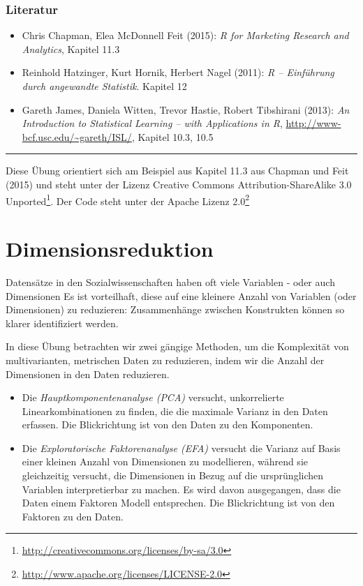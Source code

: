 \documentclass[12pt,]{book}
\providecommand{\tightlist}{%
  \setlength{\itemsep}{0pt}\setlength{\parskip}{0pt}}
\renewcommand{\href}[2]{#2\footnote{\url{#1}}}
\begin{document}
\subsection{Literatur}\label{literatur-3}

\begin{itemize}
\tightlist
\item
  Chris Chapman, Elea McDonnell Feit (2015): \emph{R for Marketing
  Research and Analytics}, Kapitel 11.3
\item
  Reinhold Hatzinger, Kurt Hornik, Herbert Nagel (2011): \emph{R --
  Einführung durch angewandte Statistik}. Kapitel 12
\item
  Gareth James, Daniela Witten, Trevor Hastie, Robert Tibshirani (2013):
  \emph{An Introduction to Statistical Learning -- with Applications in
  R}, \url{http://www-bcf.usc.edu/~gareth/ISL/}, Kapitel 10.3, 10.5
\end{itemize}

\begin{center}\rule{0.5\linewidth}{\linethickness}\end{center}

Diese Übung orientiert sich am Beispiel aus Kapitel 11.3 aus Chapman und
Feit (2015) und steht unter der Lizenz
\href{http://creativecommons.org/licenses/by-sa/3.0}{Creative Commons
Attribution-ShareAlike 3.0 Unported}. Der Code steht unter der
\href{http://www.apache.org/licenses/LICENSE-2.0}{Apache Lizenz 2.0}

\chapter{Dimensionsreduktion}\label{dimensionsreduktion}

Datensätze in den Sozialwissenschaften haben oft viele Variablen - oder
auch Dimensionen Es ist vorteilhaft, diese auf eine kleinere Anzahl von
Variablen (oder Dimensionen) zu reduzieren: Zusammenhänge zwischen
Konstrukten können so klarer identifiziert werden.

In diese Übung betrachten wir zwei gängige Methoden, um die Komplexität
von multivarianten, metrischen Daten zu reduzieren, indem wir die Anzahl
der Dimensionen in den Daten reduzieren.

\begin{itemize}
\item
  Die \emph{Hauptkomponentenanalyse (PCA)} versucht, unkorrelierte
  Linearkombinationen zu finden, die die maximale Varianz in den Daten
  erfassen. Die Blickrichtung ist von den Daten zu den Komponenten.
\item
  Die \emph{Exploratorische Faktorenanalyse (EFA)} versucht die Varianz
  auf Basis einer kleinen Anzahl von Dimensionen zu modellieren, während
  sie gleichzeitig versucht, die Dimensionen in Bezug auf die
  ursprünglichen Variablen interpretierbar zu machen. Es wird davon
  ausgegangen, dass die Daten einem Faktoren Modell entsprechen. Die
  Blickrichtung ist von den Faktoren zu den Daten.
\end{itemize}
\end{document}
